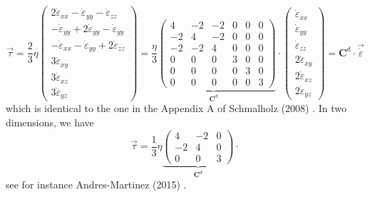 \begin{equation}
\vec \tau  
= \frac{2}{3} \eta
\left(
\begin{array}{c}
2\dot\varepsilon_{xx} -\dot\varepsilon_{yy} -\dot\varepsilon_{zz} \\ 
-\dot\varepsilon_{yy} +2\dot\varepsilon_{yy} -\dot\varepsilon_{yy} \\ 
-\dot\varepsilon_{xx} -\dot\varepsilon_{yy} +2\dot\varepsilon_{zz} \\
3\dot\varepsilon_{xy} \\
3\dot\varepsilon_{xz} \\
3\dot\varepsilon_{yz} 
\end{array}
\right)
=
\underbrace{
\frac{\eta}{3}
\left(
\begin{array}{cccccc}
4 & -2& -2& 0& 0& 0\\
-2 & 4& -2& 0& 0& 0\\
-2 & -2& 4& 0& 0& 0\\
0 &0 &0 & 3& 0& 0\\
0 &0 &0 & 0& 3& 0\\
0 &0 &0 & 0& 0& 3 
\end{array}
\right)
}_{{\bm C}^d}
\cdot
\left(
\begin{array}{c}
\dot\varepsilon_{xx} \\
\dot\varepsilon_{yy} \\
\dot\varepsilon_{zz} \\
2\dot\varepsilon_{xy} \\
2\dot\varepsilon_{xz} \\
2\dot\varepsilon_{yz} 
\end{array}
\right)
=
{\bm C}^d \cdot \vec{\dot \varepsilon}
\end{equation}
which is identical to the one in the Appendix A of Schmalholz (2008) \cite{schm08}.
In two dimensions, we have
\[
\vec\tau=\frac{1}{3}\eta 
\underbrace{
\left(
\begin{array}{ccc}
4 & -2 & 0 \\
-2 & 4 & 0 \\
0 &0 &  3 
\end{array}
\right)
}_{{\bm C}^d}
\cdot
\]
see for instance Andres-Martinez \etal (2015) \cite{anmp15}.

